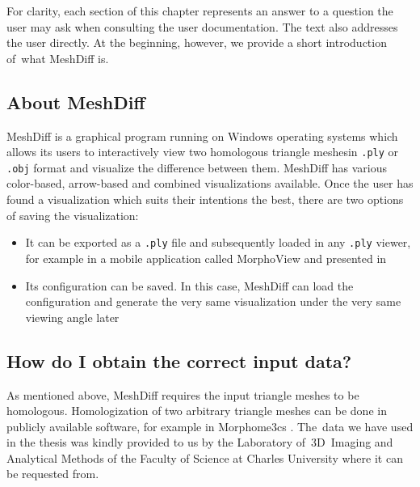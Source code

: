 For clarity, each section of this chapter represents an answer to a question the user may ask when consulting the user documentation. The text also addresses the user directly. At the beginning, however, we provide a short introduction of~what MeshDiff is.

\subsection{About MeshDiff}
\label{attch:user_doc-about}

MeshDiff is a graphical program running on Windows operating systems which allows its users to interactively view two homologous triangle meshes\footnotemark in \verb+.ply+ or \verb+.obj+ format and visualize the difference between them. MeshDiff has various color-based, arrow-based and combined visualizations available. Once the user has found a visualization which suits their intentions the best, there are two options of saving the visualization:

\begin{itemize}
\item It can be exported as a \verb+.ply+ file and subsequently loaded in any \verb+.ply+ viewer, for example in a mobile application called MorphoView and  presented in \citet{Pikora}
\item Its configuration can be saved. In this case, MeshDiff can load the configuration and generate the very same visualization under the very same viewing angle later
\end{itemize}


\subsection{How do I obtain the correct input data?}
\label{attch:user_doc-input_data}

As mentioned above, MeshDiff requires the input triangle meshes to be homologous. Homologization of two arbitrary triangle meshes can be done in publicly available software, for example in Morphome3cs \citep{Morpho}. The~data we have used in the thesis was kindly provided to us by the Laboratory of~3D~Imaging and Analytical Methods of the Faculty of Science at Charles University where it can be requested from.

